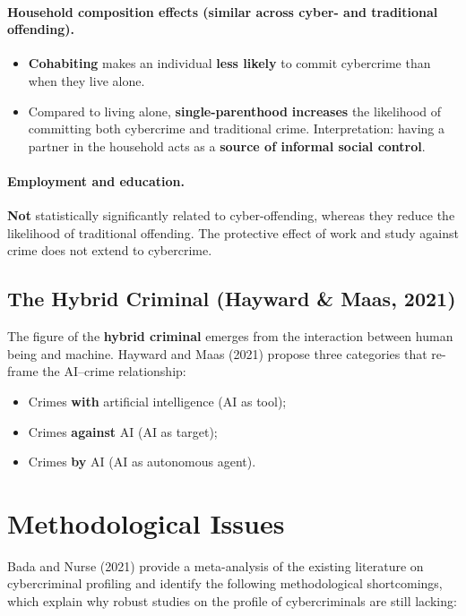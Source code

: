 \documentclass[11pt,a4paper,openany]{report}
\theoremstyle{definition}
\theoremstyle{plain}
\theoremstyle{remark}
\begin{document}
\paragraph{Household composition effects (similar across cyber- and traditional offending).}
\begin{itemize}
    \item \textbf{Cohabiting} makes an individual \textbf{less likely} to commit cybercrime than when they live alone.
    \item Compared to living alone, \textbf{single-parenthood} \textbf{increases} the likelihood of committing both cybercrime and traditional crime. Interpretation: having a partner in the household acts as a \textbf{source of informal social control}.
\end{itemize}

\paragraph{Employment and education.} \textbf{Not} statistically significantly related to cyber-offending, whereas they reduce the likelihood of traditional offending. The protective effect of work and study against crime does not extend to cybercrime.

\subsection{The Hybrid Criminal (Hayward \& Maas, 2021)}

The figure of the \textbf{hybrid criminal} emerges from the interaction between human being and machine. Hayward and Maas (2021) propose three categories that re-frame the AI--crime relationship:
\begin{itemize}
    \item Crimes \textbf{with} artificial intelligence (AI as tool);
    \item Crimes \textbf{against} AI (AI as target);
    \item Crimes \textbf{by} AI (AI as autonomous agent).
\end{itemize}

\section{Methodological Issues}

Bada and Nurse (2021) provide a meta-analysis of the existing literature on cybercriminal profiling and identify the following methodological shortcomings, which explain why robust studies on the profile of cybercriminals are still lacking:
\end{document}
